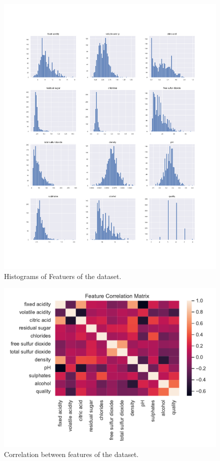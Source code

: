 \documentclass[english,notitlepage,reprint,nofootinbib]{revtex4-1}
\begin{document}
\begin{figure}[H]
	\centering
	\includegraphics[width=\linewidth]{data-visualisation.pdf}
	\caption{Histograms of Featuers of the dataset.}
	\label{fig:datavis}
\end{figure}


\begin{figure}[H]
	\centering
	\includegraphics[width=\linewidth]{feature-corr.pdf}
	\caption{Correlation between features of the dataset.}
	\label{fig:featcorr}
\end{figure}
\end{document}
